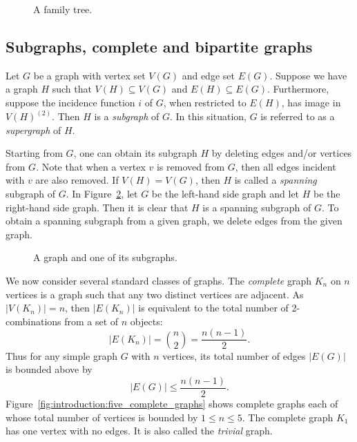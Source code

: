 \begin{figure}[!htbp]
\centering

\caption{A family tree.}
\label{fig:introduction:family_tree}
\end{figure}



\subsection{Subgraphs, complete and bipartite graphs}

Let $G$ be a graph with vertex set $V(G)$ and edge set $E(G)$. Suppose
we have a graph $H$ such that $V(H) \subseteq V(G)$ and
$E(H) \subseteq E(G)$. Furthermore, suppose the incidence function $i$
of $G$, when restricted to $E(H)$, has image in $V(H)^{(2)}$. Then $H$
is a \emph{subgraph} of $G$. In this situation, $G$ is
referred to as a \emph{supergraph} of $H$.

Starting from $G$, one can obtain its subgraph $H$ by deleting edges
and/or vertices from $G$. Note that when a vertex $v$ is removed from
$G$, then all edges incident with $v$ are also removed. If $V(H) =
V(G)$, then $H$ is called a \emph{spanning} subgraph of $G$. In
Figure~\ref{fig:introduction:star_subgraph}, let $G$ be the left-hand
side graph and let $H$ be the right-hand side graph. Then it is clear
that $H$ is a spanning subgraph of $G$. To obtain a spanning subgraph
from a given graph, we delete edges from the given graph.

\begin{figure}[!htbp]
\centering

\caption{A graph and one of its subgraphs.}
\label{fig:introduction:star_subgraph}
\end{figure}

We now consider several standard classes of graphs. The \emph{complete}
graph $K_n$ on $n$ vertices is a graph such that any two distinct
vertices are adjacent. As $|V(K_n)| = n$, then $|E(K_n)|$ is
equivalent to the total number of 2-combinations from a set of $n$
objects:
%
\begin{equation}
\label{eq:introduction:size_of_K_n}
|E(K_n)|
=
\binom{n}{2}
=
\frac{n(n-1)}{2}.
\end{equation}
%
Thus for any simple graph $G$ with $n$ vertices, its total number of
edges $|E(G)|$ is bounded above by
%
\begin{equation}
\label{eq:introduction:upper_bound_total_edges_simple_graph}
|E(G)|
\leq
\frac{n(n - 1)}{2}.
\end{equation}
%
Figure~\ref{fig:introduction:five_complete_graphs} shows complete
graphs each of whose total number of vertices is bounded by
$1 \leq n \leq 5$. The complete graph $K_1$ has one vertex with
no edges. It is also called the \emph{trivial} graph.


